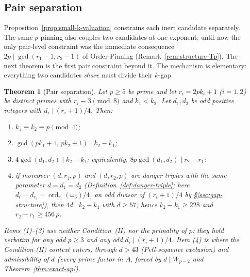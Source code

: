 \documentclass[11pt]{amsart}
\theoremstyle{plain}
\newtheorem{theorem}{Theorem}[section]
\theoremstyle{definition}
\theoremstyle{remark}
\numberwithin{equation}{section}
\newcommand{\ord}{\operatorname{ord}}
\begin{document}
\subsection{Pair separation}\label{sec:pair-separation}

Proposition~\ref{prop:small-k-valuation} constrains each inert candidate separately. The same-$p$ pinning also couples two candidates at one exponent; until now the only pair-level constraint was the immediate consequence $2p \mid \gcd(r_1 - 1, r_2 - 1)$ of Order-Pinning (Remark~\ref{rem:structure-Tp}). The next theorem is the first pair constraint beyond it. The mechanism is elementary: everything two candidates \emph{share} must divide their $k$-gap.

\begin{theorem}[Pair separation]\label{thm:pair-separation}
Let $p \geq 5$ be prime and let $r_i = 2 p k_i + 1$ ($i = 1, 2$) be distinct primes with $r_i \equiv 3 \pmod 8$ and $k_1 < k_2$. Let $d_1, d_2$ be odd positive integers with $d_i \mid (r_i + 1)/4$. Then:
\begin{enumerate}
\item $k_1 \equiv k_2 \equiv p \pmod 4$;
\item $\gcd(p k_1 + 1,\, p k_2 + 1) \mid k_2 - k_1$;
\item $4 \gcd(d_1, d_2) \mid k_2 - k_1$; equivalently, $8 p \gcd(d_1, d_2) \mid r_2 - r_1$;
\item if moreover $(d, r_1, p)$ and $(d, r_2, p)$ are danger triples with the same parameter $d = d_1 = d_2$ (Definition~\ref{def:danger-triple}; here $d_i = d_{r_i} = \ord_{r_i}(\omega_3)/4$, an odd divisor of $(r_i+1)/4$ by \S\ref{sec:gap-structure}), then $4 d \mid k_2 - k_1$ with $d \geq 57$; hence $k_2 - k_1 \geq 228$ and $r_2 - r_1 \geq 456\, p$.
\end{enumerate}
Items (1)--(3) use neither Condition~(II) nor the primality of $p$: they hold verbatim for any odd $p \geq 3$ and any odd $d_i \mid (r_i + 1)/4$. Item (4) is where the Condition-(II) context enters, through $d > 43$ (Pell-sequence exclusion) and admissibility of $d$ (every prime factor in $A$, forced by $d \mid W_{p-2}$ and Theorem~\ref{thm:exact-ap}).
\end{theorem}
\end{document}
